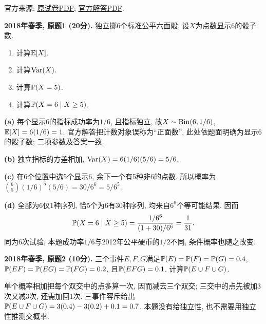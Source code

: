 \noindent 官方来源: \href{https://ocw.mit.edu/courses/18-600-probability-and-random-variables-fall-2019/0a4597f4544a9758f68ad1f5441f8233_MIT18_600F19_mid1_2018.pdf}{原试卷PDF}; \href{https://ocw.mit.edu/courses/18-600-probability-and-random-variables-fall-2019/134c16cb0b85b1dd5ff8fad6383b3415_MIT18_600F19_mid1_2018_soln.pdf}{官方解答PDF}.
\begin{exercise}\label{ex:m1-2018s-q1}
\textbf{2018年春季, 原题1 (20分).} 独立掷6个标准公平六面骰, 设$X$为点数显示6的骰子数.
\begin{enumerate}\item[(a)]\label{ex:m1-2018s-q1-a} 计算$\mathbb E[X]$.\item[(b)]\label{ex:m1-2018s-q1-b} 计算$\operatorname{Var}(X)$.\item[(c)]\label{ex:m1-2018s-q1-c} 计算$\mathbb P(X=5)$.\item[(d)]\label{ex:m1-2018s-q1-d} 计算$\mathbb P(X=6\mid X\ge5)$.\end{enumerate}
\end{exercise}
\begin{solution}
\textbf{(a)}\label{sol:m1-2018s-q1-a} 每个显示6的指标成功率为$1/6$, 且指标独立, 故$X\sim\operatorname{Bin}(6,1/6)$, $\mathbb E[X]=6(1/6)=1$. 官方解答把计数对象误称为“正面数”, 此处依题面明确为显示6的骰子数; 二项参数及答案一致.

\textbf{(b)}\label{sol:m1-2018s-q1-b} 独立指标的方差相加, $\operatorname{Var}(X)=6(1/6)(5/6)=5/6$.

\textbf{(c)}\label{sol:m1-2018s-q1-c} 在6个位置中选5个显示6, 余下一个有5种非6的点数. 所以概率为$\binom65(1/6)^5(5/6)=30/6^6=5/6^5$.

\textbf{(d)}\label{sol:m1-2018s-q1-d} 全部为6仅1种序列, 恰5个为6有30种序列, 均来自$6^6$个等可能结果. 因而
\[
\mathbb P(X=6\mid X\ge5)=\frac{1/6^6}{(1+30)/6^6}=\frac1{31}.
\]
同为6次试验, 本题成功率$1/6$与2012年公平硬币的$1/2$不同, 条件概率也随之改变.
\end{solution}

\begin{exercise}\label{ex:m1-2018s-q2}
\textbf{2018年春季, 原题2 (10分).} 三个事件$E,F,G$满足$\mathbb P(E)=\mathbb P(F)=\mathbb P(G)=0.4$, $\mathbb P(EF)=\mathbb P(EG)=\mathbb P(FG)=0.2$, 且$\mathbb P(EFG)=0.1$. 计算$\mathbb P(E\cup F\cup G)$.
\end{exercise}
\begin{solution}
\label{sol:m1-2018s-q2}
单个概率相加把每个双交中的点多算一次, 因而减去三个双交; 三交中的点先被加3次又减3次, 还需加回1次. 三事件容斥给出$\mathbb P(E\cup F\cup G)=3(0.4)-3(0.2)+0.1=0.7$. 本题没有给独立性, 也不需要用独立性推测交概率.
\end{solution}

